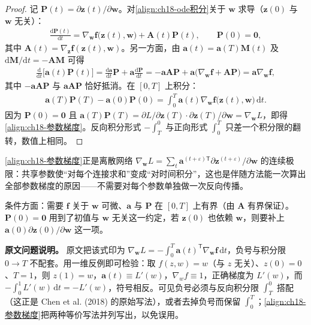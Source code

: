 \documentclass[../../main.tex]{subfiles}
\begin{document}
\begin{proof}
记 $\bm{P}(t)=\partial\bm{z}(t)/\partial\bm{w}$。对\eqref{align:ch18-ode积分}关于 $\bm{w}$ 求导（$\bm{z}(0)$ 与 $\bm{w}$ 无关）：
\begin{align*}
  \frac{\mathrm{d}\bm{P}(t)}{\mathrm{d}t}=\nabla_{\bm{w}}\bm{f}\big(\bm{z}(t),\bm{w}\big)+\bm{A}(t)\bm{P}(t),\qquad \bm{P}(0)=\bm{0},
\end{align*}
其中 $\bm{A}(t)=\nabla_{\bm{z}}\bm{f}(\bm{z}(t),\bm{w})$。另一方面，由 $\bm{a}(t)=\bm{a}(T)\bm{M}(t)$ 及 $\mathrm{d}\bm{M}/\mathrm{d}t=-\bm{A}\bm{M}$ 可得
\begin{align*}
  \frac{\mathrm{d}}{\mathrm{d}t}\Big[\bm{a}(t)\bm{P}(t)\Big]=\frac{\mathrm{d}\bm{a}}{\mathrm{d}t}\bm{P}+\bm{a}\frac{\mathrm{d}\bm{P}}{\mathrm{d}t}
  =-\bm{a}\bm{A}\bm{P}+\bm{a}\big(\nabla_{\bm{w}}\bm{f}+\bm{A}\bm{P}\big)=\bm{a}\nabla_{\bm{w}}\bm{f},
\end{align*}
其中 $-\bm{a}\bm{A}\bm{P}$ 与 $\bm{a}\bm{A}\bm{P}$ 恰好抵消。在 $[0,T]$ 上积分：
\begin{align*}
  \bm{a}(T)\bm{P}(T)-\bm{a}(0)\bm{P}(0)=\int_{0}^{T}\bm{a}(t)\nabla_{\bm{w}}\bm{f}\big(\bm{z}(t),\bm{w}\big)\,\mathrm{d}t .
\end{align*}
因为 $\bm{P}(0)=\bm{0}$ 且 $\bm{a}(T)\bm{P}(T)=\partial L/\partial\bm{z}(T)\cdot\partial\bm{z}(T)/\partial\bm{w}=\nabla_{\bm{w}}L$，即得\eqref{align:ch18-参数梯度}。反向积分形式 $-\int_{T}^{0}$ 与正向形式 $\int_{0}^{T}$ 只差一个积分限的翻转，数值上相同。
\end{proof}

\begin{remark}
\eqref{align:ch18-参数梯度}正是离散网络 $\nabla_{\bm{w}}L=\sum_{t}\bm{a}^{(t+\varepsilon)\mathsf T}\partial\bm{z}^{(t+\varepsilon)}/\partial\bm{w}$ 的连续极限：共享参数使“对每个连接求和”变成“对时间积分”，这也是伴随方法能一次算出全部参数梯度的原因——不需要对每个参数单独做一次反向传播。

条件方面：需要 $\bm{f}$ 关于 $\bm{w}$ 可微、$\bm{a}$ 与 $\bm{P}$ 在 $[0,T]$ 上有界（由 $\bm{A}$ 有界保证）。$\bm{P}(0)=\bm{0}$ 用到了初值与 $\bm{w}$ 无关这一约定，若 $\bm{z}(0)$ 也依赖 $\bm{w}$，则要补上 $\bm{a}(0)\partial\bm{z}(0)/\partial\bm{w}$ 这一项。

\textbf{原文问题说明。} 原文把该式印为 $\nabla_{\bm{w}}L=-\int_{0}^{T}\bm{a}(t)^{\mathsf T}\nabla_{\bm{w}}\bm{f}\,\mathrm{d}t$，负号与积分限 $0\to T$ 不配套。用一维反例即可检验：取 $f(z,w)=w$（与 $z$ 无关）、$z(0)=0$、$T=1$，则 $z(1)=w$，$\bm{a}(t)\equiv L'(w)$，$\nabla_{w}f\equiv1$，正确梯度为 $L'(w)$，而 $-\int_{0}^{1}L'(w)\,\mathrm{d}t=-L'(w)$，符号相反。可见负号必须与反向积分限 $\int_{T}^{0}$ 搭配（这正是 Chen et al. (2018) 的原始写法），或者去掉负号而保留 $\int_{0}^{T}$；\eqref{align:ch18-参数梯度}把两种等价写法并列写出，以免误用。
\end{remark}
\end{document}
